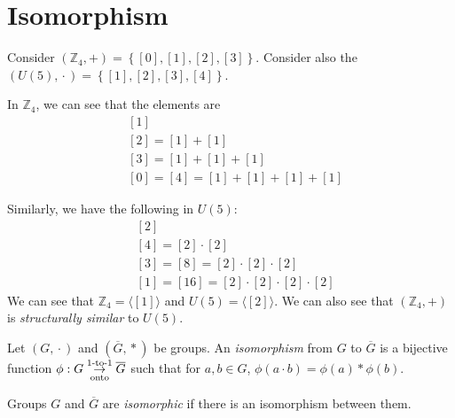 \chapter{Isomorphism}

\begin{nexample}
    Consider \((\mathbb{Z}_4, +) = \left\{[0], [1], [2], [3]\right\}\). Consider also the \((U(5), {}\cdot{}) = \left\{[1], [2], [3], [4]\right\}\).

    In \(\mathbb{Z}_4\), we can see that the elements are 
    \[
    \begin{aligned}
        & [1] \\
        & [2] = [1] + [1] \\
        & [3] = [1] + [1] + [1] \\
        & [0] = [4] = [1] + [1] + [1] + [1]
    \end{aligned}
    \]

    Similarly, we have the following in \(U(5)\):
    \[
    \begin{aligned}
        & [2] \\
        & [4] = [2] \cdot [2] \\
        & [3] = [8] = [2] \cdot [2] \cdot [2] \\
        & [1] = [16] = [2] \cdot [2] \cdot [2] \cdot [2]
    \end{aligned}
    \]
    We can see that \(\mathbb{Z}_4 = \langle [1] \rangle\) and \(U(5) = \langle [2] \rangle\). We can also see that \((\mathbb{Z}_4, +)\) is \textit{structurally similar} to \(U(5)\).
\end{nexample}

\begin{definition}[Isomorphism]
    Let \((G, {}\cdot{})\) and \((\overline{G}, {}*{})\) be groups. An \textit{isomorphism} from \(G\) to \(\overline{G}\) is a bijective function \(\phi : G \overunderset{\text{1-to-1}}{\text{onto}}{\to} \overline{G}\) such that for \(a, b \in G\), \(\phi(a \cdot b) = \phi(a) * \phi(b)\).
\end{definition}

\begin{definition}[Isomorphic]
    Groups \(G\) and \(\overline{G}\) are \textit{isomorphic} if there is an isomorphism between them.
\end{definition}

